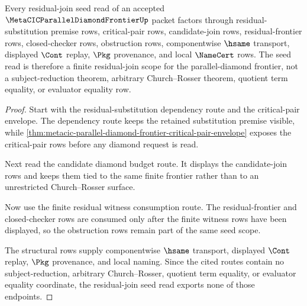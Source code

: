 \begin{theorem}
\label{thm:metacic-parallel-diamond-residual-join-seed-scope}
Every residual-join seed read of an accepted $\MetaCICParallelDiamondFrontierUp$ packet factors through residual-substitution premise rows, critical-pair rows, candidate-join rows, residual-frontier rows, closed-checker rows, obstruction rows, componentwise $\hsame$ transport, displayed $\Cont$ replay, $\Pkg$ provenance, and local $\NameCert$ rows. The seed read is therefore a finite residual-join scope for the parallel-diamond frontier, not a subject-reduction theorem, arbitrary Church--Rosser theorem, quotient term equality, or evaluator equality row.
\end{theorem}
\begin{proof}
Start with the residual-substitution dependency route and the critical-pair envelope. The dependency route keeps the retained substitution premise visible, while \autoref{thm:metacic-parallel-diamond-frontier-critical-pair-envelope} exposes the critical-pair rows before any diamond request is read.

Next read the candidate diamond budget route. It displays the candidate-join rows and keeps them tied to the same finite frontier rather than to an unrestricted Church--Rosser surface.

Now use the finite residual witness consumption route. The residual-frontier and closed-checker rows are consumed only after the finite witness rows have been displayed, so the obstruction rows remain part of the same seed scope.

The structural rows supply componentwise $\hsame$ transport, displayed $\Cont$ replay, $\Pkg$ provenance, and local naming. Since the cited routes contain no subject-reduction, arbitrary Church--Rosser, quotient term equality, or evaluator equality coordinate, the residual-join seed read exports none of those endpoints.
\end{proof}
